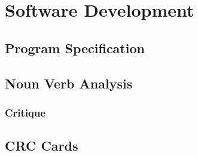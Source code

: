 \chapter{Software Development}

\section{Program Specification}

\section{Noun Verb Analysis}

\subsection{Critique}

\section{CRC Cards}


